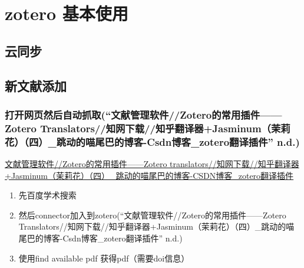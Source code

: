 \usepackage{graphicx}
\usepackage{hyperref}\hypertarget{zotero-ux57faux672cux4f7fux7528}{%
\section{zotero 基本使用}\label{zotero-ux57faux672cux4f7fux7528}}

\hypertarget{ux4e91ux540cux6b65}{%
\subsection{云同步}\label{ux4e91ux540cux6b65}}

\hypertarget{ux65b0ux6587ux732eux6dfbux52a0}{%
\subsection{新文献添加}\label{ux65b0ux6587ux732eux6dfbux52a0}}

\hypertarget{ux6253ux5f00ux7f51ux9875ux7136ux540eux81eaux52a8ux6293ux53d6wenxianguanliruanjianzoterodechangyongchajianzoteroa}{%
\subsubsection{\texorpdfstring{打开网页然后自动抓取({``文献管理软件//{Zotero的常用插件}------{Zotero}
Translators//知网下载//知乎翻译器+{Jasminum}（茉莉花）（四）\_跳动的喵尾巴的博客-{Csdn博客}\_zotero翻译插件''}
n.d.)}{打开网页然后自动抓取(``文献管理软件//Zotero的常用插件------Zotero Translators//知网下载//知乎翻译器+Jasminum（茉莉花）（四）\_跳动的喵尾巴的博客-Csdn博客\_zotero翻译插件'' n.d.)}}\label{ux6253ux5f00ux7f51ux9875ux7136ux540eux81eaux52a8ux6293ux53d6wenxianguanliruanjianzoterodechangyongchajianzoteroa}}

\href{https://blog.csdn.net/qq_43210428/article/details/120377475}{文献管理软件//Zotero的常用插件------Zotero
translators//知网下载//知乎翻译器+Jasminum（茉莉花）（四）\_跳动的喵尾巴的博客-CSDN博客\_zotero翻译插件}

\begin{enumerate}
\def\labelenumi{\arabic{enumi}.}
\item
  先百度学术搜索
\item
  然后connector加入到zotero({``文献管理软件//{Zotero的常用插件}------{Zotero}
  Translators//知网下载//知乎翻译器+{Jasminum}（茉莉花）（四）\_跳动的喵尾巴的博客-{Csdn博客}\_zotero翻译插件''}
  n.d.)
\item
  使用find available pdf 获得pdf（需要doi信息）
\end{enumerate}


